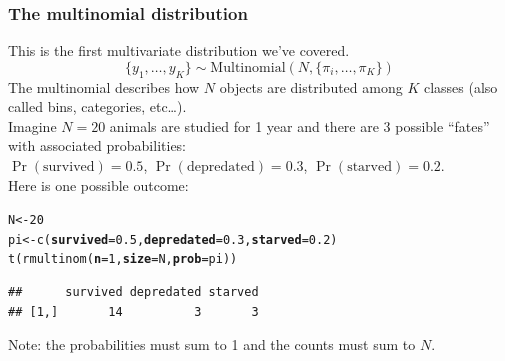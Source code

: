 \documentclass[color=usenames,dvipsnames]{beamer}\usepackage[]{graphicx}\usepackage[]{xcolor}
\makeatletter
\newcommand{\hlnum}[1]{\textcolor[rgb]{0.69,0.494,0}{#1}}%
\newcommand{\hldef}[1]{\textcolor[rgb]{0,0,0}{#1}}%
\newcommand{\hlkwb}[1]{\textcolor[rgb]{0,0.341,0.682}{#1}}%
\newcommand{\hlkwc}[1]{\textcolor[rgb]{0,0,0}{\textbf{#1}}}%
\newcommand{\hlkwd}[1]{\textcolor[rgb]{0.004,0.004,0.506}{#1}}%
\newenvironment{kframe}{%
 \def\at@end@of@kframe{}%
 \ifinner\ifhmode%
  \def\at@end@of@kframe{\end{minipage}}%
  \begin{minipage}{\columnwidth}%
 \fi\fi%
 \def\FrameCommand##1{\hskip\@totalleftmargin \hskip-\fboxsep
 \colorbox{shadecolor}{##1}\hskip-\fboxsep
     \hskip-\linewidth \hskip-\@totalleftmargin \hskip\columnwidth}%
 \MakeFramed {\advance\hsize-\width
   \@totalleftmargin\z@ \linewidth\hsize
   \@setminipage}}%
 {\par\unskip\endMakeFramed%
 \at@end@of@kframe}
\newenvironment{knitrout}{}{} %
\makeatother
\begin{document}
\begin{frame}[fragile]
  \frametitle{The multinomial distribution}
  \small
  This is the first multivariate distribution we've covered. \\
  \[
    \{y_{1}, \dots, y_{K}\}  \sim \mathrm{Multinomial}(N, \{\pi_i, \dots, \pi_K\})
  \]
  \pause
  The multinomial describes how $N$ objects are distributed among
  $K$ classes (also called bins, categories, etc\dots). \\
  \pause
  \vfill
  Imagine $N=20$ animals are studied for 1 year and there are 3
  possible ``fates'' with associated probabilities: \\
  $\Pr(\mathrm{survived})=0.5$, $\Pr(\mathrm{depredated})=0.3$, $\Pr(\mathrm{starved})=0.2$. \\
  \pause
  \vfill
  Here is one possible outcome:
  \vspace{-6pt}
\begin{knitrout}\footnotesize
{}\color{fgcolor}\begin{kframe}
\begin{alltt}
\hldef{N} \hlkwb{<-} \hlnum{20}
\hldef{pi} \hlkwb{<-} \hlkwd{c}\hldef{(}\hlkwc{survived}\hldef{=}\hlnum{0.5}\hldef{,} \hlkwc{depredated}\hldef{=}\hlnum{0.3}\hldef{,} \hlkwc{starved}\hldef{=}\hlnum{0.2}\hldef{)}
\hlkwd{t}\hldef{(}\hlkwd{rmultinom}\hldef{(}\hlkwc{n}\hldef{=}\hlnum{1}\hldef{,} \hlkwc{size}\hldef{=N,} \hlkwc{prob}\hldef{=pi))}
\end{alltt}
\begin{verbatim}
##      survived depredated starved
## [1,]       14          3       3
\end{verbatim}
\end{kframe}
\end{knitrout}
  \pause
  \centering
  Note: the probabilities must sum to 1 and the counts must sum to $N$. \\
\end{frame}



\end{document}
